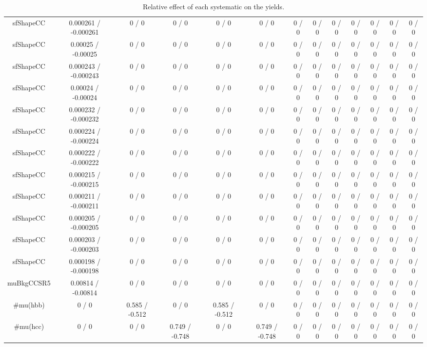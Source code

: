 \documentclass[10pt]{article}
\begin{document}
\begin{table}[htbp]
\begin{center}
\begin{tabular}{|c|c|c|c|c|c|c|c|c|c|c|c|c|}
  sfShapeCC & 0.000261 / -0.000261 & 0 / 0 & 0 / 0 & 0 / 0 & 0 / 0 & 0 / 0 & 0 / 0 & 0 / 0 & 0 / 0 & 0 / 0 & 0 / 0 & 0 / 0 \\ 
  sfShapeCC & 0.00025 / -0.00025 & 0 / 0 & 0 / 0 & 0 / 0 & 0 / 0 & 0 / 0 & 0 / 0 & 0 / 0 & 0 / 0 & 0 / 0 & 0 / 0 & 0 / 0 \\ 
  sfShapeCC & 0.000243 / -0.000243 & 0 / 0 & 0 / 0 & 0 / 0 & 0 / 0 & 0 / 0 & 0 / 0 & 0 / 0 & 0 / 0 & 0 / 0 & 0 / 0 & 0 / 0 \\ 
  sfShapeCC & 0.00024 / -0.00024 & 0 / 0 & 0 / 0 & 0 / 0 & 0 / 0 & 0 / 0 & 0 / 0 & 0 / 0 & 0 / 0 & 0 / 0 & 0 / 0 & 0 / 0 \\ 
  sfShapeCC & 0.000232 / -0.000232 & 0 / 0 & 0 / 0 & 0 / 0 & 0 / 0 & 0 / 0 & 0 / 0 & 0 / 0 & 0 / 0 & 0 / 0 & 0 / 0 & 0 / 0 \\ 
  sfShapeCC & 0.000224 / -0.000224 & 0 / 0 & 0 / 0 & 0 / 0 & 0 / 0 & 0 / 0 & 0 / 0 & 0 / 0 & 0 / 0 & 0 / 0 & 0 / 0 & 0 / 0 \\ 
  sfShapeCC & 0.000222 / -0.000222 & 0 / 0 & 0 / 0 & 0 / 0 & 0 / 0 & 0 / 0 & 0 / 0 & 0 / 0 & 0 / 0 & 0 / 0 & 0 / 0 & 0 / 0 \\ 
  sfShapeCC & 0.000215 / -0.000215 & 0 / 0 & 0 / 0 & 0 / 0 & 0 / 0 & 0 / 0 & 0 / 0 & 0 / 0 & 0 / 0 & 0 / 0 & 0 / 0 & 0 / 0 \\ 
  sfShapeCC & 0.000211 / -0.000211 & 0 / 0 & 0 / 0 & 0 / 0 & 0 / 0 & 0 / 0 & 0 / 0 & 0 / 0 & 0 / 0 & 0 / 0 & 0 / 0 & 0 / 0 \\ 
  sfShapeCC & 0.000205 / -0.000205 & 0 / 0 & 0 / 0 & 0 / 0 & 0 / 0 & 0 / 0 & 0 / 0 & 0 / 0 & 0 / 0 & 0 / 0 & 0 / 0 & 0 / 0 \\ 
  sfShapeCC & 0.000203 / -0.000203 & 0 / 0 & 0 / 0 & 0 / 0 & 0 / 0 & 0 / 0 & 0 / 0 & 0 / 0 & 0 / 0 & 0 / 0 & 0 / 0 & 0 / 0 \\ 
  sfShapeCC & 0.000198 / -0.000198 & 0 / 0 & 0 / 0 & 0 / 0 & 0 / 0 & 0 / 0 & 0 / 0 & 0 / 0 & 0 / 0 & 0 / 0 & 0 / 0 & 0 / 0 \\ 
  muBkgCCSR5 & 0.00814 / -0.00814 & 0 / 0 & 0 / 0 & 0 / 0 & 0 / 0 & 0 / 0 & 0 / 0 & 0 / 0 & 0 / 0 & 0 / 0 & 0 / 0 & 0 / 0 \\ 
  #mu(hbb) & 0 / 0 & 0.585 / -0.512 & 0 / 0 & 0.585 / -0.512 & 0 / 0 & 0 / 0 & 0 / 0 & 0 / 0 & 0 / 0 & 0 / 0 & 0 / 0 & 0 / 0 \\ 
  #mu(hcc) & 0 / 0 & 0 / 0 & 0.749 / -0.748 & 0 / 0 & 0.749 / -0.748 & 0 / 0 & 0 / 0 & 0 / 0 & 0 / 0 & 0 / 0 & 0 / 0 & 0 / 0 \\ 
\hline 
\end{tabular} 
\caption{Relative effect of each systematic on the yields.} 
\end{center} 
\end{table} 
\end{document}
